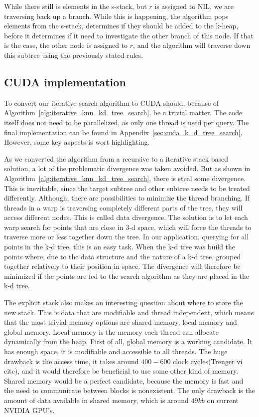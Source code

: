 While there still is elements in the s-stack, but $r$ is assigned to NIL, we are traversing back up a branch. While this is happening, the algorithm pops elements from the s-stack, determines if they should be added to the k-heap, before it determines if it need to investigate the other branch of this node. If that is the case, the other node is assigned to $r$, and the algorithm will traverse down this subtree using the previously stated rules.



\subsection{CUDA implementation} %
\label{sub:the_implementation}

To convert our iterative search algorithm to CUDA should, because of Algorithm~\ref{alg:iterative_knn_kd_tree_search}, be a trivial matter. The code itself does not need to be parallelized, as only one thread is used per query. The final implementation can be found in Appendix~\ref{sec:cuda_k_d_tree_search}. However, some key aspects is wort highlighting.


As we converted the algorithm from a recursive to a iterative stack based solution, a lot of the problematic divergence was taken avoided. But as shown in Algorithm~\ref{alg:iterative_knn_kd_tree_search}, there is steal some divergence. This is inevitable, since the target subtree and other subtree needs to be treated differently. Although, there are possibilities to minimize the thread branching. If threads in a warp is traversing completely different parts of the tree, they will access different nodes. This is called data divergence. The solution is to let each warp search for points that are close in 3-d space, which will force the threads to traverse more or less together down the tree. In our application, querying for all points in the k-d tree, this is an easy task. When the k-d tree was build the points where, due to the data structure and the nature of a k-d tree, grouped together relatively to their position in space. The divergence will therefore be minimized if the points are fed to the search algorithm as they are placed in the k-d tree.


The explicit stack also makes an interesting question about where to store the new stack. This is data that are modifiable and thread independent, which means that the most trivial memory options are shared memory, local memory and global memory. Local memory is the memory each thread can allocate dynamically from the heap. First of all, global memory is a working candidate. It has enough space, it is modifiable and accessible to all threads. The huge drawback is the access time, it takes around $400-600$ clock cycles(Trenger vi cite), and it would therefore be beneficial to use some other kind of memory. Shared memory would be a perfect candidate, because the memory is fast and the need to communicate between blocks is nonexistent. The only drawback is the amount of data available in shared memory, which is around $49 kb$ on current NVIDIA GPU's. 



